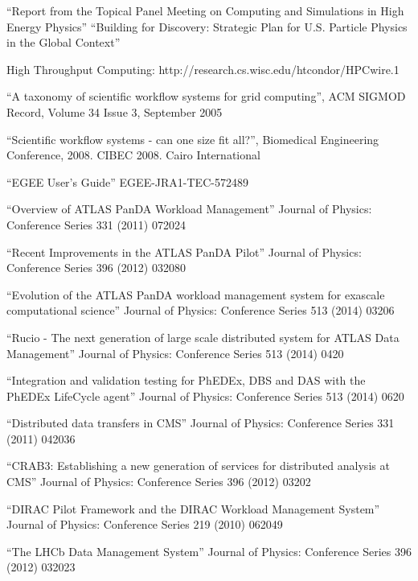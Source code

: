 \begin{thebibliography}{99}
 ``Report from the Topical Panel Meeting on Computing and
Simulations in High Energy Physics''
 ``Building for Discovery: Strategic Plan for U.S. Particle Physics in the Global Context''

 High Throughput Computing: http://research.cs.wisc.edu/htcondor/HPCwire.1

 ``A taxonomy of scientific workflow systems for grid computing'', ACM SIGMOD Record, Volume 34 Issue 3, September 2005

 ``Scientific workflow systems - can one size fit all?'', Biomedical Engineering Conference, 2008. CIBEC 2008. Cairo International

 ``EGEE User’s Guide'' EGEE-JRA1-TEC-572489

 ``Overview of ATLAS PanDA Workload Management'' Journal of Physics: Conference Series 331 (2011) 072024

 ``Recent Improvements in the ATLAS PanDA Pilot'' Journal of Physics: Conference Series 396 (2012) 032080

 ``Evolution of the ATLAS PanDA workload management system for exascale computational science'' Journal of Physics: Conference Series 513 (2014) 03206

 ``Rucio - The next generation of large scale distributed system for ATLAS Data Management'' Journal of Physics: Conference Series 513 (2014) 0420

 ``Integration and validation testing for PhEDEx, DBS and DAS with the PhEDEx LifeCycle agent'' Journal of Physics: Conference Series 513 (2014) 0620

 ``Distributed data transfers in CMS'' Journal of Physics: Conference Series 331 (2011) 042036

 ``CRAB3: Establishing a new generation of services for distributed analysis at CMS'' Journal of Physics: Conference Series 396 (2012) 03202

 ``DIRAC Pilot Framework and the DIRAC Workload Management System'' Journal of Physics: Conference Series 219 (2010) 062049

 ``The LHCb Data Management System'' Journal of Physics: Conference Series 396 (2012) 032023


\end{thebibliography}
